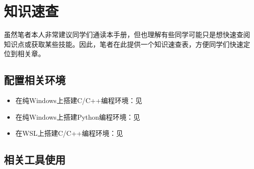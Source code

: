 \chapter{知识速查}

虽然笔者本人非常建议同学们通读本手册，但也理解有些同学可能只是想快速查阅知识点或获取某些技能。因此，笔者在此提供一个知识速查表，方便同学们快速定位到相关章。

\section*{配置相关环境}

\begin{itemize}
    \item 在纯Windows上搭建C/C++编程环境：见
    \item 在纯Windows上搭建Python编程环境：见
    \item 在WSL上搭建C/C++编程环境：见
\end{itemize}

\section*{相关工具使用}

